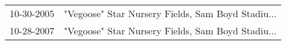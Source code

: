 \begin{supertabular}{ll}
 10-30-2005 &  "Vegoose" Star Nursery Fields, Sam Boyd Stadiu... \\
 10-28-2007 &  "Vegoose" Star Nursery Fields, Sam Boyd Stadiu... \\
\end{supertabular}
